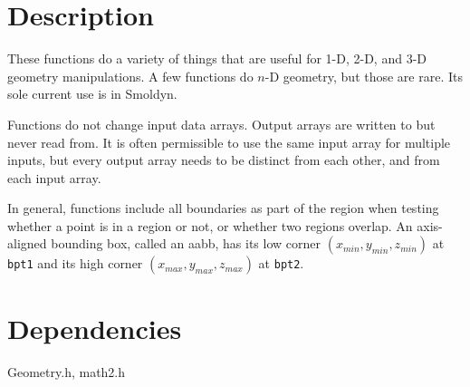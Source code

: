 \documentclass[11pt]{article}
\newcommand {\ttt} {\texttt}
\begin{document}
\section{Description}

These functions do a variety of things that are useful for 1-D, 2-D, and 3-D geometry manipulations. A few functions do $n$-D geometry, but those are rare. Its sole current use is in Smoldyn.

Functions do not change input data arrays. Output arrays are written to but never read from. It is often permissible to use the same input array for multiple inputs, but every output array needs to be distinct from each other, and from each input array.

In general, functions include all boundaries as part of the region when testing whether a point is in a region or not, or whether two regions overlap. An axis-aligned bounding box, called an aabb, has its low corner $(x_{min}, y_{min}, z_{min})$ at \ttt{bpt1} and its high corner $(x_{max}, y_{max}, z_{max})$ at \ttt{bpt2}.

\section{Dependencies}
Geometry.h, math2.h

\end{document}
